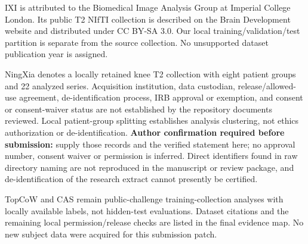 IXI is attributed to the Biomedical Image Analysis Group at Imperial College London. Its public T2 NIfTI collection is described on the Brain Development website and distributed under CC BY-SA 3.0. Our local training/validation/test partition is separate from the source collection. No unsupported dataset publication year is assigned.

NingXia denotes a locally retained knee T2 collection with eight patient groups and 22 analyzed series. Acquisition institution, data custodian, release/allowed-use agreement, de-identification process, IRB approval or exemption, and consent or consent-waiver status are not established by the repository documents reviewed. Local patient-group splitting establishes analysis clustering, not ethics authorization or de-identification. \textbf{Author confirmation required before submission:} supply those records and the verified statement here; no approval number, consent waiver or permission is inferred. Direct identifiers found in raw directory naming are not reproduced in the manuscript or review package, and de-identification of the research extract cannot presently be certified.

TopCoW and CAS remain public-challenge training-collection analyses with locally available labels, not hidden-test evaluations. Dataset citations and the remaining local permission/release checks are listed in the final evidence map. No new subject data were acquired for this submission patch.
